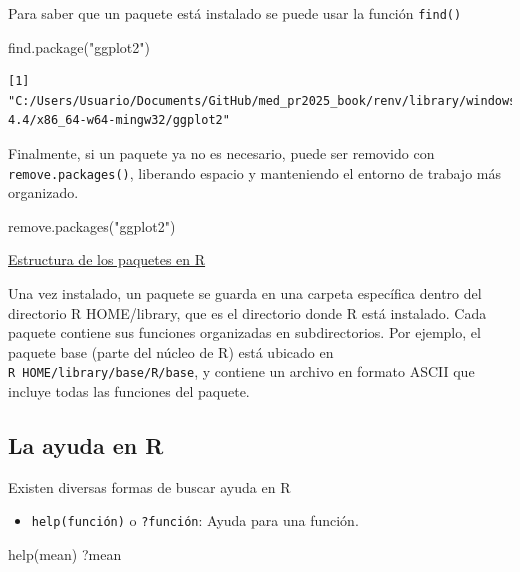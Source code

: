 \documentclass[
  letterpaper,
]{scrbook}
\newenvironment{Shaded}{\begin{snugshade}}{\end{snugshade}}
\newcommand{\FunctionTok}[1]{\textcolor[rgb]{0.28,0.35,0.67}{#1}}
\newcommand{\NormalTok}[1]{\textcolor[rgb]{0.00,0.23,0.31}{#1}}
\newcommand{\StringTok}[1]{\textcolor[rgb]{0.13,0.47,0.30}{#1}}
\providecommand{\tightlist}{%
  \setlength{\itemsep}{0pt}\setlength{\parskip}{0pt}}\usepackage{longtable,booktabs,array}
\begin{document}
Para saber que un paquete está instalado se puede usar la función
\texttt{find()}

\begin{Shaded}
\begin{Highlighting}[]
\FunctionTok{find.package}\NormalTok{(}\StringTok{"ggplot2"}\NormalTok{)}
\end{Highlighting}
\end{Shaded}

\begin{verbatim}
[1] "C:/Users/Usuario/Documents/GitHub/med_pr2025_book/renv/library/windows/R-4.4/x86_64-w64-mingw32/ggplot2"
\end{verbatim}

Finalmente, si un paquete ya no es necesario, puede ser removido con
\texttt{remove.packages()}, liberando espacio y manteniendo el entorno
de trabajo más organizado.

\begin{Shaded}
\begin{Highlighting}[]
\FunctionTok{remove.packages}\NormalTok{(}\StringTok{"ggplot2"}\NormalTok{)}
\end{Highlighting}
\end{Shaded}

\uline{Estructura de los paquetes en R}

Una vez instalado, un paquete se guarda en una carpeta específica dentro
del directorio R HOME/library, que es el directorio donde R está
instalado. Cada paquete contiene sus funciones organizadas en
subdirectorios. Por ejemplo, el paquete base (parte del núcleo de R)
está ubicado en \texttt{R\ HOME/library/base/R/base}, y contiene un
archivo en formato ASCII que incluye todas las funciones del paquete.

\hypertarget{la-ayuda-en-r}{%
\subsection{La ayuda en R}\label{la-ayuda-en-r}}

Existen diversas formas de buscar ayuda en R

\begin{itemize}
\tightlist
\item
  \texttt{help(función)} o \texttt{?función}: Ayuda para una función.
\end{itemize}

\begin{Shaded}
\begin{Highlighting}[]
\FunctionTok{help}\NormalTok{(mean)}
\NormalTok{?mean}
\end{Highlighting}
\end{Shaded}
\end{document}
